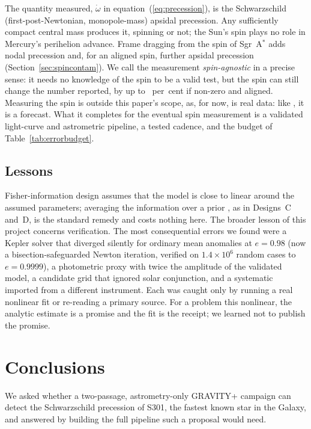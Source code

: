 \documentclass{aastex701}
\begin{document}
The quantity measured, $\dot\omega$ in equation~(\ref{eq:precession}), is the Schwarzschild (first-post-Newtonian, monopole-mass) apsidal precession. Any sufficiently compact central mass produces it, spinning or not; the Sun's spin plays no role in Mercury's perihelion advance. Frame dragging from the spin of Sgr~A$^*$ adds nodal precession and, for an aligned spin, further apsidal precession (Section~\ref{sec:spincontam}). We call the measurement \emph{spin-agnostic} in a precise sense: it needs no knowledge of the spin to be a valid test, but the spin can still change the number reported, by up to \spinLtPctChiOneZeroZero{}~per~cent if non-zero and aligned. Measuring the spin is outside this paper's scope, as, for now, is real data: like \citet{piran2026}, it is a forecast. What it completes for the eventual spin measurement is a validated light-curve and astrometric pipeline, a tested cadence, and the budget of Table~\ref{tab:errorbudget}.

\subsection{Lessons}

Fisher-information design assumes that the model is close to linear around the assumed parameters; averaging the information over a prior \citep{chaloner1995}, as in Designs~C and~D, is the standard remedy and costs nothing here. The broader lesson of this project concerns verification. The most consequential errors we found were a Kepler solver that diverged silently for ordinary mean anomalies at $e=0.98$ (now a bisection-safeguarded Newton iteration, verified on $1.4\times10^6$ random cases to $e=0.9999$), a photometric proxy with twice the amplitude of the validated model, a candidate grid that ignored solar conjunction, and a systematic imported from a different instrument. Each was caught only by running a real nonlinear fit or re-reading a primary source. For a problem this nonlinear, the analytic estimate is a promise and the fit is the receipt; we learned not to publish the promise.

\section{Conclusions}
\label{sec:summary}

We asked whether a two-passage, astrometry-only GRAVITY+ campaign can detect the Schwarzschild precession of S301, the fastest known star in the Galaxy, and answered by building the full pipeline such a proposal would need.
\end{document}
